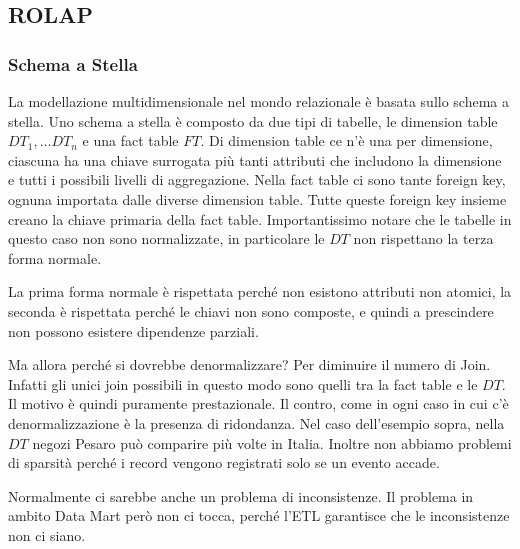 \subsection{ROLAP}
\subsubsection{Schema a Stella}
La modellazione multidimensionale nel mondo relazionale è basata sullo schema a stella.
Uno schema a stella è composto da due tipi di tabelle, le dimension table $DT_1, ... DT_n$ e una fact table $FT$.
Di dimension table ce n'è una per dimensione, ciascuna ha una chiave surrogata più tanti attributi che includono la dimensione e tutti i possibili livelli di aggregazione.\newline
Nella fact table ci sono tante foreign key, ognuna importata dalle diverse dimension table. Tutte queste foreign key insieme creano la chiave primaria della fact table.
\noindent Importantissimo notare che le tabelle in questo caso non sono normalizzate, in particolare le $DT$ non rispettano la terza forma normale.
\begin{info}
	La prima forma normale è rispettata perché non esistono attributi non atomici, la seconda è rispettata perché le chiavi non sono composte, e quindi a prescindere non possono esistere dipendenze parziali.
\end{info}
Ma allora perché si dovrebbe denormalizzare? Per diminuire il numero di Join. Infatti gli unici join possibili in questo modo sono quelli tra la fact table e le $DT$. Il motivo è quindi puramente prestazionale. Il contro, come in ogni caso in cui c'è denormalizzazione è la presenza di ridondanza. Nel caso dell'esempio sopra, nella $DT$ negozi Pesaro può comparire più volte in Italia.
Inoltre non abbiamo problemi di sparsità perché i record vengono registrati solo se un evento accade. 
\begin{warn}
	Normalmente ci sarebbe anche un problema di inconsistenze. Il problema in ambito Data Mart però non ci tocca, perché l'ETL garantisce che le inconsistenze non ci siano.
\end{warn}
